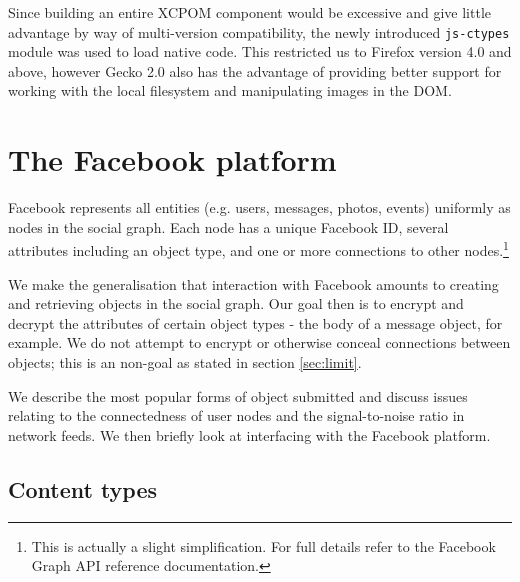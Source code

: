 Since building an entire XCPOM component would be excessive and give little advantage by way of multi-version compatibility, the newly introduced {\tt js-ctypes} module was used to load native code. This restricted us to Firefox version 4.0 and above, however Gecko 2.0 also has the advantage of providing better support for working with the local filesystem and manipulating images in the DOM.


\FloatBarrier
\section{The Facebook platform}
\label{sec:facebook}


Facebook represents all entities (e.g. users, messages, photos, events) uniformly as nodes in the social graph. Each node has a unique Facebook ID, several attributes including an object type, and one or more connections to other nodes.\footnote{This is actually a slight simplification. For full details refer to the Facebook Graph API reference documentation.}

We make the generalisation that interaction with Facebook amounts to creating and retrieving objects in the social graph. Our goal then is to encrypt and decrypt the attributes of certain object types - the body of a message object, for example. We do not attempt to encrypt or otherwise conceal connections between objects; this is an non-goal as stated in section \ref{sec:limit}.

We describe the most popular forms of object submitted and discuss issues relating to the connectedness of user nodes and the signal-to-noise ratio in network feeds. We then briefly look at interfacing with the Facebook platform.

\FloatBarrier
\subsection{Content types}
\label{sec:content}

